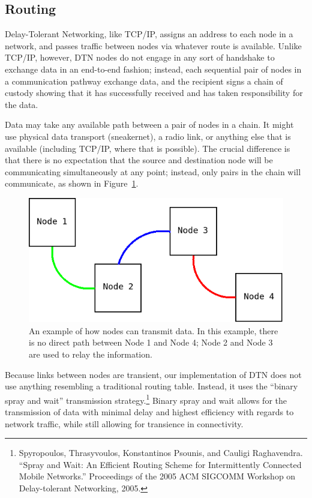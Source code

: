 \documentclass[12pt]{article}
\begin{document}
  \subsection{Routing}
  \label{subsec:routing}
  
    Delay-Tolerant Networking, like TCP/IP, assigns an address to each node in a network, and passes traffic between nodes via whatever route is available. Unlike TCP/IP, however, DTN nodes do not engage in any sort of handshake to exchange data in an end-to-end fashion; instead, each sequential pair of nodes in a communication pathway exchange data, and the recipient signs a chain of custody showing that it has successfully received and has taken responsibility for the data.
    
    Data may take any available path between a pair of nodes in a chain. It might use physical data transport (sneakernet), a radio link, or anything else that is available (including TCP/IP, where that is possible). The crucial difference is that there is no expectation that the source and destination node will be communicating simultaneously at any point; instead, only pairs in the chain will communicate, as shown in Figure~\ref{fig:chaincomm}.
    
    \begin{figure}[h]
      \centering
      \includegraphics[scale=0.5]{Diagram1.png}
      \caption{An example of how nodes can transmit data. In this example, there is no direct path between Node 1 and Node 4; Node 2 and Node 3 are used to relay the information.}
      \label{fig:chaincomm}
    \end{figure}
    
    Because links between nodes are transient, our implementation of DTN does not use anything resembling a traditional routing table. Instead, it uses the ``binary spray and wait'' transmission strategy.\footnote{Spyropoulos, Thrasyvoulos, Konstantinos Psounis, and Cauligi Raghavendra. ``Spray and Wait: An Efficient Routing Scheme for Intermittently Connected Mobile Networks.'' Proceedings of the 2005 ACM SIGCOMM Workshop on Delay-tolerant Networking, 2005.} Binary spray and wait allows for the transmission of data with minimal delay and highest efficiency with regards to network traffic, while still allowing for transience in connectivity.
    
\end{document}

